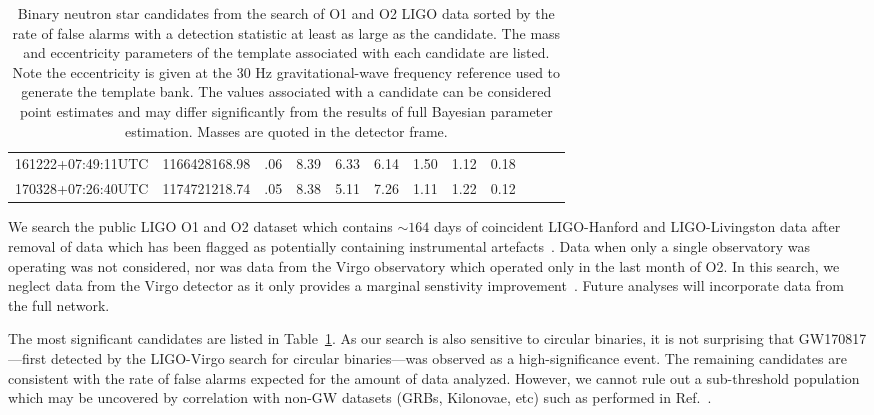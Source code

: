 \begin{table}
\begin{center}
{\begin{tabular}{ccrcrrrrrrrr}
161222+07:49:11UTC          & 1166428168.98          &        .06                     &       8.39          &       6.33          &       6.14          &       1.50          &       1.12          &       0.18         \\
170328+07:26:40UTC          & 1174721218.74          &        .05                     &       8.38          &       5.11          &       7.26          &       1.11          &       1.22          &       0.12         \\
\end{tabular}}
    \caption{Binary neutron star candidates from the search of O1 and O2 LIGO data sorted by the rate of false alarms with a detection statistic at least as large as the candidate. The mass and eccentricity parameters of the template associated with each candidate are listed. Note the eccentricity is given at the 30 Hz gravitational-wave frequency reference used to generate the template bank. The values associated with a candidate can be considered point estimates and may differ significantly from the results of full Bayesian parameter estimation. Masses are quoted in the detector frame.}
    \label{table:search}
  \end{center}
\end{table}


We search the public LIGO O1 and O2 dataset which contains $\sim164$ days of coincident LIGO-Hanford and LIGO-Livingston data after removal of data which has been flagged as potentially containing instrumental artefacts~\cite{TheLIGOScientific:2016zmo,TheLIGOScientific:2017lwt,Vallisneri:2014vxa}. Data when only a single observatory was operating was not considered, nor was data from the Virgo observatory which operated only in the last month of O2. In this search, we neglect data from the Virgo detector as it only provides a marginal senstivity improvement~\cite{Nitz:2019hdf}. Future analyses will incorporate data from the full network.

The most significant candidates are listed in Table~\ref{table:search}. As our search is also sensitive to circular binaries, it is not surprising that GW170817---first detected by the LIGO-Virgo search for circular binaries---was observed as a high-significance event. The remaining candidates are consistent with the rate of false alarms expected for the amount of data analyzed. However, we cannot rule out a sub-threshold population which may be uncovered by correlation with non-GW datasets (GRBs, Kilonovae, etc) such as performed in Ref.~\cite{Nitz:2019bxt}.

